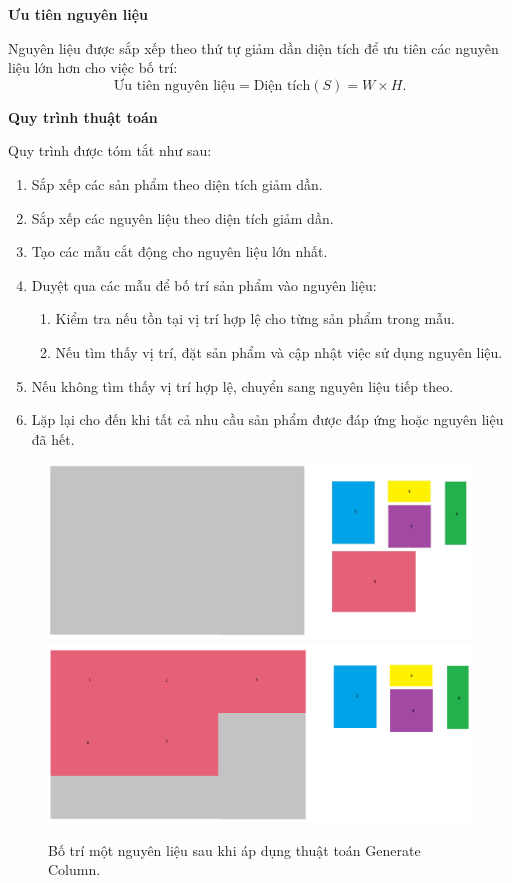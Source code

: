 \textbf{Ưu tiên nguyên liệu}

Nguyên liệu được sắp xếp theo thứ tự giảm dần diện tích để ưu tiên các nguyên liệu lớn hơn cho việc bố trí:
\[
\text{Ưu tiên nguyên liệu} = \text{Diện tích}(S) = W \times H.
\]

\textbf{Quy trình thuật toán}

Quy trình được tóm tắt như sau:
\begin{enumerate}[1) ]
    \item Sắp xếp các sản phẩm theo diện tích giảm dần.

    \item Sắp xếp các nguyên liệu theo diện tích giảm dần.

    \item Tạo các mẫu cắt động cho nguyên liệu lớn nhất.

    \item Duyệt qua các mẫu để bố trí sản phẩm vào nguyên liệu:

    \begin{enumerate}
        \item Kiểm tra nếu tồn tại vị trí hợp lệ cho từng sản phẩm trong mẫu.
        \item Nếu tìm thấy vị trí, đặt sản phẩm và cập nhật việc sử dụng nguyên liệu.
    \end{enumerate}
   
    \item Nếu không tìm thấy vị trí hợp lệ, chuyển sang nguyên liệu tiếp theo.

    \item Lặp lại cho đến khi tất cả nhu cầu sản phẩm được đáp ứng hoặc nguyên liệu đã hết.
\end{enumerate}

\begin{figure}[!htp]
    \centering
    \includegraphics[width=0.5\linewidth]{Images/gencolumn.png}
    \includegraphics[width=0.5\linewidth]{Images/gencolumn_res.png}
    \caption{Bố trí một nguyên liệu sau khi áp dụng thuật toán Generate Column.}
    \label{fig:stock-layout}
\end{figure}

